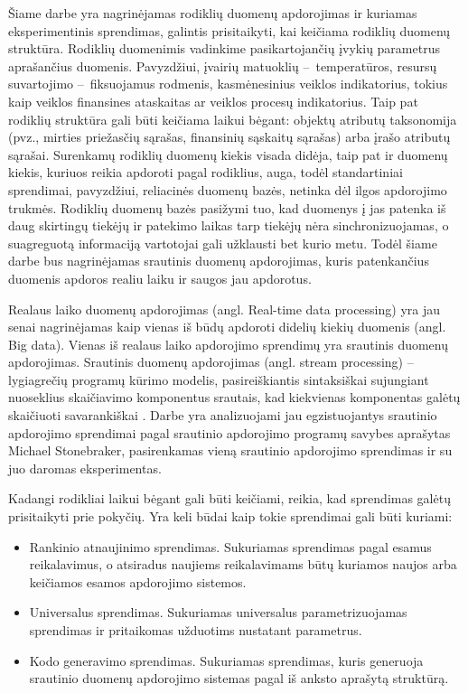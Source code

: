 \documentclass{VUMIFPSbakalaurinis}
\begin{document}
\tableofcontents

 
Šiame darbe yra nagrinėjamas rodiklių duomenų apdorojimas ir kuriamas eksperimentinis sprendimas, galintis prisitaikyti, kai keičiama rodiklių duomenų struktūra. Rodiklių duomenimis vadinkime pasikartojančių įvykių parametrus aprašančius duomenis. Pavyzdžiui, įvairių matuoklių – temperatūros, resursų suvartojimo – fiksuojamus rodmenis, kasmėnesinius veiklos indikatorius, tokius kaip veiklos finansines ataskaitas ar veiklos procesų indikatorius. Taip pat rodiklių struktūra gali būti keičiama laikui bėgant: objektų atributų taksonomija (pvz., mirties priežasčių sąrašas, finansinių sąskaitų sąrašas) arba įrašo atributų sąrašai. Surenkamų rodiklių duomenų kiekis visada didėja, taip pat ir duomenų kiekis, kuriuos reikia apdoroti pagal rodiklius, auga, todėl standartiniai sprendimai, pavyzdžiui, reliacinės duomenų bazės, netinka dėl ilgos apdorojimo trukmės. Rodiklių duomenų bazės pasižymi tuo, kad duomenys į jas patenka iš daug skirtingų tiekėjų ir patekimo laikas tarp tiekėjų nėra sinchronizuojamas, o suagreguotą informaciją vartotojai gali užklausti bet kurio metu. Todėl šiame darbe bus nagrinėjamas srautinis duomenų apdorojimas, kuris patenkančius duomenis apdoros realiu laiku ir saugos jau apdorotus. \par
Realaus laiko duomenų apdorojimas (angl. Real-time data processing) yra jau senai nagrinėjamas kaip vienas iš būdų apdoroti didelių kiekių duomenis (angl. Big data). Vienas iš realaus laiko apdorojimo sprendimų yra srautinis duomenų apdorojimas. Srautinis duomenų apdorojimas (angl. stream processing) – lygiagrečių programų kūrimo modelis, pasireiškiantis sintaksiškai sujungiant nuoseklius skaičiavimo komponentus srautais, kad kiekvienas komponentas galėtų skaičiuoti savarankiškai \cite{shortstreamproc}. Darbe yra analizuojami jau egzistuojantys srautinio apdorojimo sprendimai pagal srautinio apdorojimo programų savybes aprašytas Michael Stonebraker, pasirenkamas vieną srautinio apdorojimo sprendimas ir su juo daromas eksperimentas. 
\par
Kadangi rodikliai laikui bėgant gali būti keičiami, reikia, kad sprendimas galėtų prisitaikyti prie pokyčių. Yra keli būdai kaip tokie sprendimai gali būti kuriami:
\begin{itemize}
    \item Rankinio atnaujinimo sprendimas. Sukuriamas sprendimas pagal esamus reikalavimus, o atsiradus naujiems reikalavimams būtų kuriamos naujos arba keičiamos esamos apdorojimo sistemos. 
    \item Universalus sprendimas. Sukuriamas universalus parametrizuojamas sprendimas ir pritaikomas užduotims nustatant parametrus.
    \item Kodo generavimo sprendimas. Sukuriamas sprendimas, kuris generuoja srautinio duomenų apdorojimo sistemas pagal iš anksto aprašytą struktūrą.  
\end{itemize}   
\end{document}
